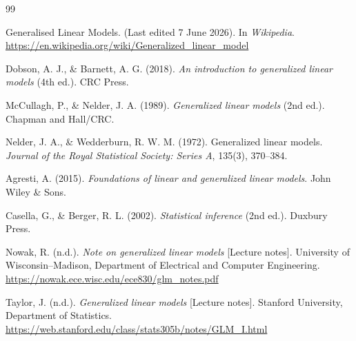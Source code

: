 \documentclass[12pt,a4paper]{report}
\begin{document}
\begin{thebibliography}{99}\setlength{\itemsep}{0.5em}

 Generalised Linear Models. (Last edited 7 June 2026). In \textit{Wikipedia}. \url{https://en.wikipedia.org/wiki/Generalized_linear_model}

 Dobson, A. J., \& Barnett, A. G. (2018). \textit{An introduction to generalized linear models} (4th ed.). CRC Press.

 McCullagh, P., \& Nelder, J. A. (1989). \textit{Generalized linear models} (2nd ed.). Chapman and Hall/CRC.

 Nelder, J. A., \& Wedderburn, R. W. M. (1972). Generalized linear models. \textit{Journal of the Royal Statistical Society: Series A}, 135(3), 370--384.

 Agresti, A. (2015). \textit{Foundations of linear and generalized linear models}. John Wiley \& Sons.

 Casella, G., \& Berger, R. L. (2002). \textit{Statistical inference} (2nd ed.). Duxbury Press.

 Nowak, R. (n.d.). \textit{Note on generalized linear models} [Lecture notes]. University of Wisconsin--Madison, Department of Electrical and Computer Engineering. \url{https://nowak.ece.wisc.edu/ece830/glm_notes.pdf}

 Taylor, J. (n.d.). \textit{Generalized linear models} [Lecture notes]. Stanford University, Department of Statistics. \url{https://web.stanford.edu/class/stats305b/notes/GLM_I.html}

\end{thebibliography}
\end{document}
